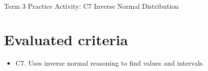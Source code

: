 \makeatletter
{}
\makeatother	






	
	\begin{center}
		{\LARGE Term 3 Practice Activity: C7 Inverse Normal Distribution}
	\end{center}
	
	\tableofcontents
	
	\section*{Evaluated criteria}
	\begin{itemize}[leftmargin=*]
		\item C7. Uses inverse normal reasoning to find values and intervals.
	\end{itemize}
	
